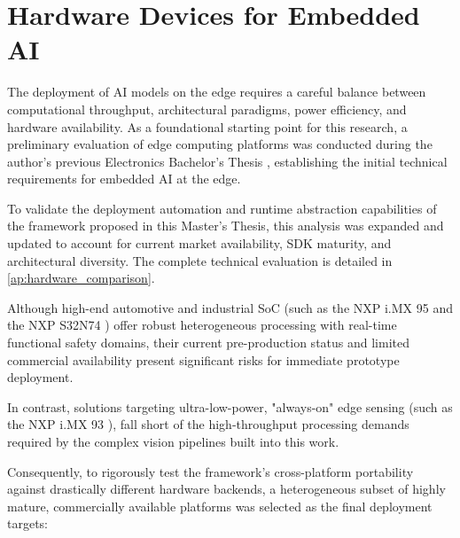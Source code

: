 \section{Hardware Devices for Embedded \texorpdfstring{\acrshort{AI}}{AI}}\label{sec:sota:boards}

The deployment of \gls{AI} models on the edge requires a careful balance between computational throughput, architectural paradigms, power efficiency, and hardware availability. As a foundational starting point for this research, a preliminary evaluation of edge computing platforms was conducted during the author's previous Electronics Bachelor's Thesis \cite{morabarbaDeviceGeneratingPrescription2025}, establishing the initial technical requirements for embedded \gls{AI} at the edge.

To validate the deployment automation and runtime abstraction capabilities of the framework proposed in this Master's Thesis, this analysis was expanded and updated to account for current market availability, \gls{SDK} maturity, and architectural diversity. The complete technical evaluation is detailed in \autoref{ap:hardware_comparison}.

Although high-end automotive and industrial \gls{SoC} (such as the NXP i.MX 95 \cite{IMX95} and the NXP S32N74 \cite{S32N7SuperIntegrationProcessor}) offer robust heterogeneous processing with real-time functional safety domains, their current pre-production status and limited commercial availability present significant risks for immediate prototype deployment. 

In contrast, solutions targeting ultra-low-power, "always-on" edge sensing (such as the NXP i.MX 93 \cite{IMX93}), fall short of the high-throughput processing demands required by the complex vision pipelines built into this work.

Consequently, to rigorously test the framework's cross-platform portability against drastically different hardware backends, a heterogeneous subset of highly mature, commercially available platforms was selected as the final deployment targets:


